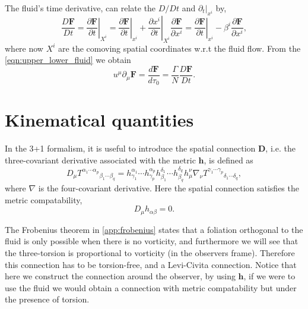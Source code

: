 The fluid's time derivative, can relate the $D/Dt$ and $\partial_t|_{x^i}$ by,
\begin{equation}
    \frac{D\mathbf{F}}{Dt}=\left.\frac{\partial \mathbf{F}}{\partial t}\right|_{X^i}=\left.\frac{\partial \mathbf{F}}{\partial t}\right|_{x^i}+\left.\frac{\partial x^i}{\partial t}\right|_{X^i}\frac{\partial \mathbf{F}}{\partial x^i}=\left.\frac{\partial \mathbf{F}}{\partial t}\right|_{x^i}-\beta^i\frac{\partial \mathbf{F}}{\partial x^i},
    \label{eqn:fluid_total_time_expression}
\end{equation}
where now $X^i$ are the comoving spatial coordinates w.r.t the fluid flow. From the \cref{eqn:upper_lower_fluid} we obtain
\begin{equation}
    u^\mu\partial_\mu \mathbf{F}=\frac{d\mathbf{F}}{d\tau_0}=\frac{\Gamma}{N}\frac{D\mathbf{F}}{Dt}.
    \label{eqn:relation_total_time_fluid_vec}
\end{equation}



\section{Kinematical quantities}

In the 3+1 formalism, it is useful to introduce the spatial connection $\mathbf{D}$, i.e. the three-covariant derivative associated with the metric $\mathbf{h}$, is defined as
\begin{equation}
    D_\mu T^{\alpha_1\cdots\alpha_p}{}_{\beta_1\cdots\beta_q}=h^{\alpha_1}_{\gamma_1}\cdots h^{\alpha_p}_{\gamma_p}h^{\delta_1}_{\beta_1}\cdots h^{\delta_q}_{\beta_q} h_\mu^\nu \nabla_\nu T^{\gamma_1\cdots\gamma_p}{}_{\delta_1\cdots\delta_q},
    \label{eqn:spatial_cov_dev_def}
\end{equation}
where $\nabla$ is the four-covariant derivative. Here the spatial connection satisfies the metric compatability,
\begin{equation}
    D_\mu h_{\alpha\beta}=0.
\end{equation}

The Frobenius theorem in \cref{app:frobenius} states that a foliation orthogonal to the fluid is only possible when there is no vorticity, and furthermore we will see that the three-torsion is proportional to vorticity (in the observers frame).
Therefore this connection has to be torsion-free, and a Levi-Civita connection. 
Notice that here we construct the connection around the observer, by using $\mathbf{h}$, if we were to use the fluid we would obtain a connection with metric compatability but under the presence of torsion. 

